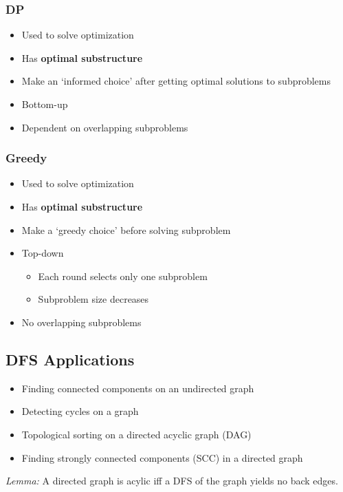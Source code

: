 \documentclass{article}
\begin{document}
\begin{multicols*}{2}
    \begin{multicols*}{2}
        \subsubsection*{DP}
        \begin{itemize}
            \item Used to solve optimization
            \item Has \textbf{optimal substructure}
            \item Make an `informed choice' after getting optimal solutions to subproblems
            \item Bottom-up
            \item Dependent on overlapping subproblems
        \end{itemize}
        \subsubsection*{Greedy}
        \begin{itemize}
            \item Used to solve optimization
            \item Has \textbf{optimal substructure}
            \item Make a `greedy choice' before solving subproblem
            \item Top-down
                  \begin{itemize}
                      \item Each round selects only one subproblem
                      \item Subproblem size decreases
                  \end{itemize}
            \item No overlapping subproblems
        \end{itemize}
    \end{multicols*}

    \subsection*{DFS Applications}
    \begin{itemize}
        \item Finding connected components on an undirected graph
        \item Detecting cycles on a graph
        \item Topological sorting on a directed acyclic graph (DAG)
        \item Finding strongly connected components (SCC) in a directed graph
    \end{itemize}
    \emph{Lemma:} A directed graph is acylic iff a DFS of the graph yields no back edges.


\end{multicols*}
\end{document}
